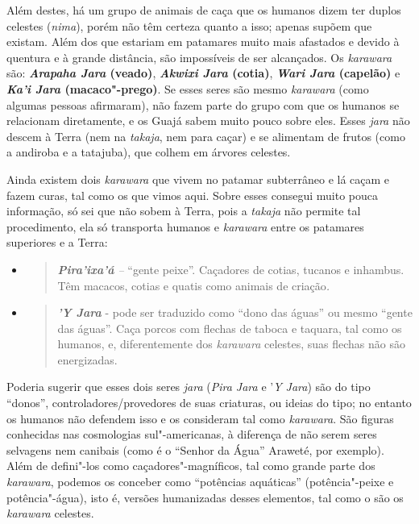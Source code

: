 Além destes, há um grupo de animais de caça que os humanos dizem ter
duplos celestes (\emph{nima}), porém não têm certeza quanto a isso;
apenas supõem que existam. Além dos que estariam em patamares muito mais
afastados e devido à quentura e à grande distância, são impossíveis de
ser alcançados. Os \emph{karawara} são: \textbf{\emph{Arapaha Jara}
(veado)}, \textbf{\emph{Akwixi Jara} (cotia)}, \textbf{\emph{Wari Jara}
(capelão)} e \textbf{\emph{Ka'i Jara} (macaco"-prego)}. Se esses seres
são mesmo \emph{karawara} (como algumas pessoas afirmaram), não fazem
parte do grupo com que os humanos se relacionam diretamente, e os Guajá
sabem muito pouco sobre eles. Esses \emph{jara} não descem à Terra (nem
na \emph{takaja}, nem para caçar) e se alimentam de frutos (como a
andiroba e a tatajuba), que colhem em árvores celestes.

Ainda existem dois \emph{karawara} que vivem no patamar subterrâneo e lá
caçam e fazem curas, tal como os que vimos aqui. Sobre esses consegui
muito pouca informação, só sei que não sobem à Terra, pois a
\emph{takaja} não permite tal procedimento, ela só transporta humanos e
\emph{karawara} entre os patamares superiores e a Terra:

\begin{itemize}
\item
  \begin{quote}
  \emph{\textbf{Pira'ixa'á} --} ``gente peixe''. Caçadores de cotias,
  tucanos e inhambus. Têm macacos, cotias e quatis como animais de
  criação\emph{. }
  \end{quote}
\item
  \begin{quote}
  \emph{\textbf{'Y Jara}} - pode ser traduzido como ``dono das águas'' ou
  mesmo ``gente das águas''. Caça porcos com flechas de taboca e
  taquara, tal como os humanos, e, diferentemente dos \emph{karawara}
  celestes, suas flechas não são energizadas.
  \end{quote}
\end{itemize}

Poderia sugerir que esses dois seres \emph{jara} (\emph{Pira Jara} e
'\emph{Y Jara}) são do tipo ``donos'', controladores/provedores de suas
criaturas, ou ideias do tipo; no entanto os humanos não defendem isso e
os consideram tal como \emph{karawara}. São figuras conhecidas nas
cosmologias sul"-americanas, à diferença de não serem seres selvagens nem
canibais (como é o ``Senhor da Água'' Araweté, por exemplo). Além de
defini"-los como caçadores"-magníficos, tal como grande parte dos
\emph{karawara}, podemos os conceber como ``potências aquáticas''
(potência"-peixe e potência"-água), isto é, versões humanizadas desses
elementos, tal como o são os \emph{karawara} celestes.

